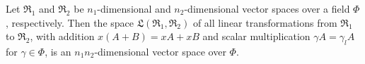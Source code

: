 Let $\mathfrak{R}_1$ and $\mathfrak{R}_2$ be $n_1$-dimensional and $n_2$-dimensional vector spaces over a field $\Phi$, respectively. Then the space $\mathfrak{L}(\mathfrak{R}_1, \mathfrak{R}_2)$ of all linear transformations from $\mathfrak{R}_1$ to $\mathfrak{R}_2$, with addition $x(A + B) = xA + xB$ and scalar multiplication $\gamma A = \gamma_l A$ for $\gamma \in \Phi$, is an $n_1 n_2$-dimensional vector space over $\Phi$.
